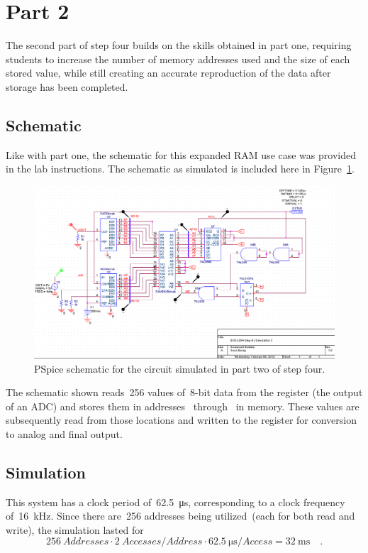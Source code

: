 \section{Part 2}

The second part of step four builds on the skills obtained in part one,
requiring students to increase the number of memory addresses used and the size
of each stored value, while still creating an accurate reproduction of the data
after storage has been completed.

\subsection{Schematic}
Like with part one, the schematic for this expanded RAM use case was provided
in the lab instructions.  The schematic as simulated is included here in
Figure~\ref{f:schem2}.
%
\begin{figure}[H]
\centering
	\includegraphics[width=.8\textwidth]{img/shot/schem2.png}
	\parbox{.8\textwidth}{
	\caption[Part 2 Schematic]{PSpice schematic for the circuit simulated in
	part two of step four.}
	\label{f:schem2}}
\end{figure}
%
The schematic shown reads~256 values of~8-bit data from the  register
(the output of an ADC) and stores them in addresses~
through~ in memory.  These values are subsequently read from those
locations and written to the  register for conversion to analog and
final output.

\subsection{Simulation}
This system has a clock period of~\SI{62.5}{\micro\second}, corresponding to a
clock frequency of~\SI{16}{\kilo\hertz}.  Since there are~256 addresses being
utilized~(each for both read and write), the simulation lasted
for
%
\begin{equation*}
\SI{256}{Addresses} \cdot \SI{2}{Accesses\per Address} \cdot
	\SI{62.5}{\micro\second\per Access} = \SI{32}{\milli\second} \quad \text{.}
\end{equation*}

